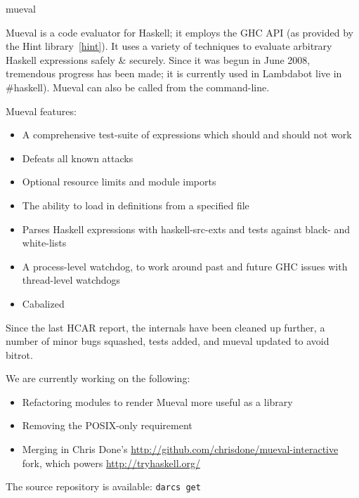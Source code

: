 \begin{hcarentry}[updated]{mueval}
\label{mueval}
\makeheader

Mueval is a code evaluator for Haskell; it employs the GHC API (as provided by the Hint library~\cref{hint}). It uses a variety of techniques to evaluate arbitrary Haskell expressions safely \& securely. Since it was begun in June 2008, tremendous progress has been made; it is currently used in Lambdabot live in \#haskell). Mueval can also be called from the command-line.

Mueval features:
\begin{itemize}
\item A comprehensive test-suite of expressions which should and should not work
\item Defeats all known attacks
\item Optional resource limits and module imports
\item The ability to load in definitions from a specified file
\item Parses Haskell expressions with haskell-src-exts and tests against black- and white-lists
\item A process-level watchdog, to work around past and future GHC issues with thread-level watchdogs
\item Cabalized
\end{itemize}

Since the last HCAR report, the internals have been cleaned up further, a number of minor bugs squashed, tests added, and mueval updated to avoid bitrot.

We are currently working on the following:
\begin{itemize}
\item Refactoring modules to render Mueval more useful as a library
\item Removing the POSIX-only requirement
\item Merging in Chris Done's \href{mueval-interactive}{http://github.com/chrisdone/mueval-interactive} fork, which powers \url{http://tryhaskell.org/}
\end{itemize}

\FurtherReading
The source repository is available:
 \texttt{darcs get}
\end{hcarentry}
